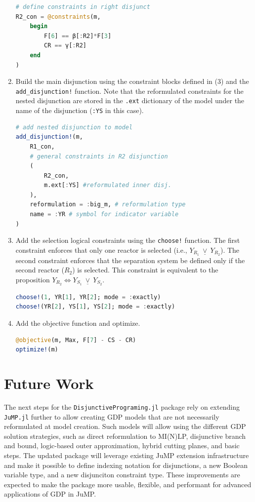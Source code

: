 \documentclass{juliacon}
\begin{document}
\begin{enumerate}
\begin{lstlisting}[language = Julia]
# define constraints in right disjunct
R2_con = @constraints(m,
    begin
        F[6] == β[:R2]*F[3]
        CR == γ[:R2]      
    end
)
\end{lstlisting}
    \item Build the main disjunction using the constraint blocks defined in (3) and the \verb|add_disjunction!| function. Note that the reformulated constraints for the nested disjunction are stored in the \verb|.ext| dictionary of the model under the name of the disjunction (\verb|:YS| in this case).
\begin{lstlisting}[language = Julia]
# add nested disjunction to model
add_disjunction!(m,
    R1_con,
    # general constraints in R2 disjunction
    (
        R2_con,
        m.ext[:YS] #reformulated inner disj.
    ),
    reformulation = :big_m, # reformulation type
    name = :YR # symbol for indicator variable
)
\end{lstlisting}
    \item Add the selection logical constraints using the \verb|choose!| function. The first constraint enforces that only one reactor is selected (i.e., $Y_{R_1} \ \underline{\vee} \ Y_{R_2}$). The second constraint enforces that the separation system be defined only if the second reactor ($R_2$) is selected. This constraint is equivalent to the proposition $Y_{R_2} \Leftrightarrow Y_{S_1} \ \underline{\vee} \ Y_{S_2}$.
\begin{lstlisting}[language = Julia]
choose!(1, YR[1], YR[2]; mode = :exactly)
choose!(YR[2], YS[1], YS[2]; mode = :exactly)
\end{lstlisting}
    \item Add the objective function and optimize. 
\begin{lstlisting}[language = Julia]
@objective(m, Max, F[7] - CS - CR)
optimize!(m)
\end{lstlisting}
\end{enumerate}

\section{Future Work}
The next steps for the \verb|DisjunctivePrograming.jl| package rely on extending \verb|JuMP.jl| further to allow creating GDP models that are not necessarily reformulated at model creation. Such models will allow using the different GDP solution strategies, such as direct reformulation to MI(N)LP, disjunctive branch and bound, logic-based outer approximation, hybrid cutting planes, and basic steps. The updated package will leverage existing JuMP extension infrastructure and make it possible to define indexing notation for disjunctions, a new Boolean variable type, and a new disjunciton constraint type. These improvements are expected to make the package more usable, flexible, and performant for advanced applications of GDP in JuMP.
\end{document}
